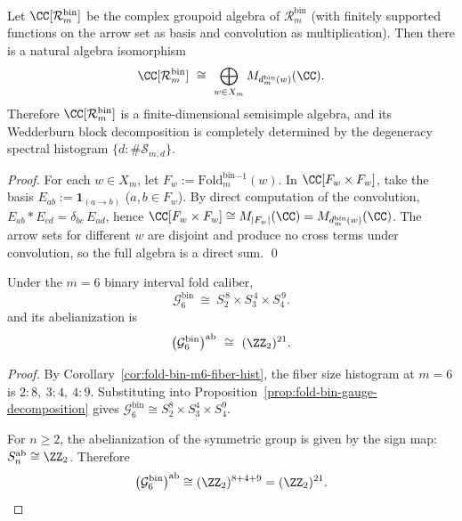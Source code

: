 \begin{proposition}\label{prop:fold-bin-groupoid-algebra-wedderburn}
Let \(\CC[\mathcal{R}^{\mathrm{bin}}_m]\) be the complex groupoid algebra of \(\mathcal{R}^{\mathrm{bin}}_m\) (with finitely supported functions on the arrow set as basis and convolution as multiplication).
Then there is a natural algebra isomorphism
\[
\CC[\mathcal{R}^{\mathrm{bin}}_m]\ \cong\ \bigoplus_{w\in X_m} M_{d^{\mathrm{bin}}_m(w)}(\CC).
\]
Therefore \(\CC[\mathcal{R}^{\mathrm{bin}}_m]\) is a finite-dimensional semisimple algebra, and its Wedderburn block decomposition is completely determined by the degeneracy spectral histogram \(\{d:\#\mathcal{S}_{m,d}\}\).
\end{proposition}
\begin{proof}
For each \(w\in X_m\), let \(F_w:=\mathrm{Fold}^{\mathrm{bin}}_m{}^{-1}(w)\).
In \(\CC[F_w\times F_w]\), take the basis
\(
E_{ab}:=\mathbf{1}_{(a\to b)}
\) (\(a,b\in F_w\)).
By direct computation of the convolution,
\(
E_{ab}*E_{cd}=\delta_{bc}\,E_{ad}
\),
hence \(\CC[F_w\times F_w]\cong M_{|F_w|}(\CC)=M_{d^{\mathrm{bin}}_m(w)}(\CC)\).
The arrow sets for different \(w\) are disjoint and produce no cross terms under convolution, so the full algebra is a direct sum. \qed
\end{proof}

\begin{corollary}[Gauge group and \texorpdfstring{$(\ZZ_2)^{21}$}{(Z2)\^21} charge lattice at \texorpdfstring{$m=6$}{m=6}]\label{cor:fold-bin-gauge-m6}
Under the \(m=6\) binary interval fold caliber,
\[
\mathcal{G}^{\mathrm{bin}}_6
\ \cong\
S_{2}^{\,8}\times S_{3}^{\,4}\times S_{4}^{\,9}.
\]
and its abelianization is
\[
\bigl(\mathcal{G}^{\mathrm{bin}}_6\bigr)^{\mathrm{ab}}
\ \cong\
(\ZZ_2)^{21}.
\]
\end{corollary}
\begin{proof}
By Corollary~\ref{cor:fold-bin-m6-fiber-hist}, the fiber size histogram at \(m=6\) is
\(
2:8,\ 3:4,\ 4:9
\).
Substituting into Proposition~\ref{prop:fold-bin-gauge-decomposition} gives
\(
\mathcal{G}^{\mathrm{bin}}_6\cong S_2^{8}\times S_3^{4}\times S_4^{9}
\).
\par
For \(n\ge 2\), the abelianization of the symmetric group is given by the sign map:
\(
S_n^{\mathrm{ab}}\cong \ZZ_2
\).
Therefore
\[
\bigl(\mathcal{G}^{\mathrm{bin}}_6\bigr)^{\mathrm{ab}}
\cong (\ZZ_2)^{8+4+9}=(\ZZ_2)^{21}.
\]
\end{proof}

